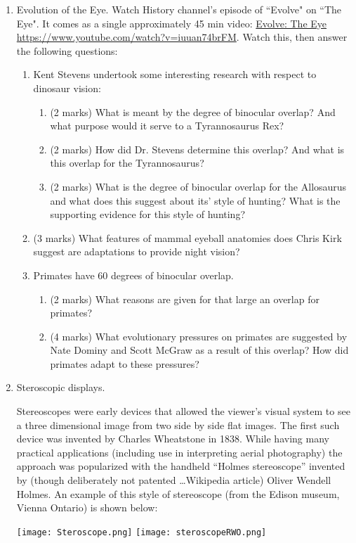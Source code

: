 \documentclass[12]{article}
\begin{document}
\begin{enumerate}
\item Evolution of the Eye.  Watch History channel's episode of ``Evolve"  on ``The Eye".  It comes as a single approximately 45 min video:
\href{https://www.youtube.com/watch?v=iuuan74brFM}{\color{blue} Evolve: The Eye {\small https://www.youtube.com/watch?v=iuuan74brFM}}.  
Watch this, then answer the following questions:
\begin{enumerate}
\item Kent Stevens undertook some interesting research with respect to dinosaur vision:
\begin{enumerate}
\item (2 marks) What is meant by the degree of binocular overlap?  And what purpose would it serve to a Tyrannosaurus Rex?
\item (2 marks) How did Dr. Stevens determine this overlap? And what is this overlap for the Tyrannosaurus?
\item (2 marks) What is the degree of binocular overlap for the Allosaurus and what does this suggest about its' style of hunting?  What is the supporting evidence for this style of hunting?
\end{enumerate}
\item (3 marks) What features of mammal eyeball anatomies does Chris Kirk suggest are adaptations to provide night vision?
\item Primates have 60 degrees of binocular overlap. 
\begin{enumerate}
\item (2 marks) What reasons are given for that large an overlap for primates? 
\item (4 marks) What evolutionary pressures on primates are suggested by Nate Dominy and Scott McGraw as a result of this overlap?  How did primates adapt to these pressures?
\end{enumerate}
\end{enumerate}

\item Steroscopic displays.

Stereoscopes were early devices that allowed the viewer's visual system to see a three dimensional image from two side by side flat images.  The first such device was invented by Charles Wheatstone in 1838.  While having many practical applications (including use in interpreting aerial photography) the approach was popularized with the handheld ``Holmes stereoscope'' invented by (though deliberately not patented \ldots Wikipedia article) Oliver Wendell Holmes.
An example of this style of stereoscope (from the Edison museum, Vienna Ontario) is shown below:
\begin{center}
\texttt{[image: Steroscope.png]} 
\texttt{[image: steroscopeRWO.png]} 
\end{center}


\end{enumerate}
\end{document}
